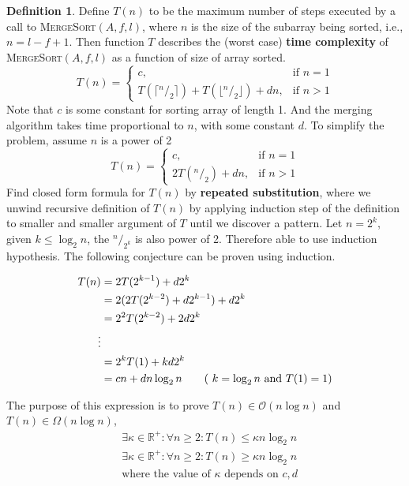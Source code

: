 \documentclass[11pt]{article}
\theoremstyle{plain}%
\theoremstyle{definition}
\newtheorem{defn}{Definition}
\theoremstyle{remark}
\newcommand*\rfrac[2]{{}^{#1}\!/_{#2}}
\newcommand{\R}{\mathbb{R}}
\begin{document}
\begin{defn}
  \label{MergeSort time complexity}
  Define $T(n)$ to be the maximum number of steps executed by a call to \textsc{MergeSort}$(A, f, l)$, where $n$ is the size of the subarray being sorted, i.e., $n = l-f+1$. Then function $T$ describes the (worst case) \textbf{time complexity} of
  \textsc{MergeSort}$(A, f, l)$ as a function of size of array sorted.
  \[
    T(n)=
    \begin{cases}
      c, & \text{if } n = 1\\
      T(\lceil \rfrac{n}{2}\rceil) + T(\lfloor \rfrac{n}{2} \rfloor) + dn, & \text{if } n>1
    \end{cases}
  \]
  Note that $c$ is some constant for sorting array of length 1. And the merging algorithm takes time proportional to $n$, with some constant $d$. To simplify the problem, assume $n$ is a power of 2
  \[
    T(n)=
    \begin{cases}
      c, & \text{if } n = 1\\
      2T(\rfrac{n}{2}) + dn, & \text{if } n>1
    \end{cases}
  \]
  Find closed form formula for $T(n)$ by \textbf{repeated substitution}, where we unwind recursive definition of $T(n)$ by applying induction step of the definition to smaller and smaller argument of $T$ until we discover a pattern. Let $n=2^k$, given $k\leq \log_2{n}$, the $\rfrac{n}{2^k}$ is also power of 2. Therefore able to use induction hypothesis. The following conjecture can be proven using induction.

  \begin{align*}
    T(n) &= 2T(2^{k-1}) + d2^k \\
    &= 2( 2T(2^{k-2}) + d2^{k-1}) + d2^k \\
    &= 2^2T(2^{k-2}) + 2d2^k \\
    \vdots\\
    &= 2^kT(1) + kd2^k \\
    &= cn + dn\log_2{n} \tag{ $k=\log_2{n}$ and $T(1) = 1$}
  \end{align*}

  The purpose of this expression is to prove $T(n)\in \mathcal{O}(n\log{n})$ and $T(n)\in \Omega(n\log{n})$,
  \begin{align*}
    &\exists \kappa\in\R^+: \forall n\geq2: T(n) \leq \kappa n\log_2{n}\\
    &\exists \kappa\in\R^+: \forall n\geq2: T(n) \geq \kappa n\log_2{n}\\
    &\text{where the value of $\kappa$ depends on $c,d$}
  \end{align*}


\end{defn}
\end{document}
